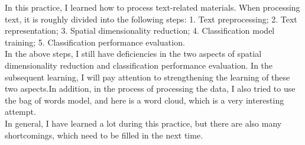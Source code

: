 \documentclass{tikzposter} %
\begin{document}
\begin{columns}
{%


}


{
\begin{description}
  \item 
  In this practice, I learned how to process text-related materials. 
  When processing text, it is roughly divided into the following steps: 
  1. Text preprocessing; 2. Text representation; 3. Spatial dimensionality reduction; 
  4. Classification model training; 5. Classification performance evaluation. \\
  In the above steps, I still have deficiencies in the two aspects of spatial 
  dimensionality reduction and classification performance evaluation. 
  In the subsequent learning, I will pay attention to strengthening the learning 
  of these two aspects.In addition, in the process of processing the data, I also 
  tried to use the bag of words model, and here is a word cloud, which is a very interesting attempt.\\
  
  In general, I have learned a lot during this practice, but there are also many shortcomings, 
  which need to be filled in the next time.
\end{description}
}



\end{columns}
\end{document}
